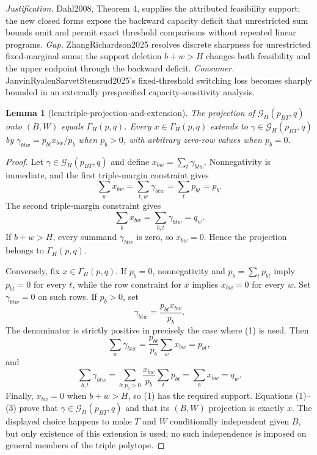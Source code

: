 \documentclass{article}
\newtheorem{lemma}{Lemma}
\begin{document}
\par\smallskip\noindent \textit{Justification.} Dahl2008, Theorem 4, supplies the attributed feasibility support; the new closed forms expose the backward capacity deficit that unrestricted sum bounds omit and permit exact threshold comparisons without repeated linear programs. \textit{Gap.} ZhangRichardson2025 resolves discrete sharpness for unrestricted fixed-marginal sums; the support deletion \(b+w>H\) changes both feasibility and the upper endpoint through the backward deficit. \textit{Consumer.} JanvinRyalenSarvetStensrud2025's fixed-threshold switching loss becomes sharply bounded in an externally prespecified capacity-sensitivity analysis.

\begin{lemma}[lem:triple-projection-and-extension]\label{lem:triple-projection-and-extension}
The projection of \(\mathcal G_H(p_{BT},q)\) onto \((B,W)\) equals \(\Gamma_H(p,q)\). Every \(x\in\Gamma_H(p,q)\) extends to \(\gamma\in\mathcal G_H(p_{BT},q)\) by \(\gamma_{btw}=p_{bt}x_{bw}/p_b\) when \(p_b>0\), with arbitrary zero-row values when \(p_b=0\).
\end{lemma}
\begin{proof}
Let \(\gamma\in\mathcal G_H(p_{BT},q)\) and define \(x_{bw}=\sum_t\gamma_{btw}\).  Nonnegativity is immediate, and the first triple-margin constraint gives
\[
 \sum_wx_{bw}=\sum_{t,w}\gamma_{btw}=\sum_tp_{bt}=p_b.
\]
The second triple-margin constraint gives
\[
 \sum_bx_{bw}=\sum_{b,t}\gamma_{btw}=q_w.
\]
If \(b+w>H\), every summand \(\gamma_{btw}\) is zero, so \(x_{bw}=0\).  Hence the projection belongs to \(\Gamma_H(p,q)\).

Conversely, fix \(x\in\Gamma_H(p,q)\).  If \(p_b=0\), nonnegativity and \(p_b=\sum_tp_{bt}\) imply \(p_{bt}=0\) for every \(t\), while the row constraint for \(x\) implies \(x_{bw}=0\) for every \(w\).  Set \(\gamma_{btw}=0\) on such rows.  If \(p_b>0\), set
\[
 \gamma_{btw}=\frac{p_{bt}x_{bw}}{p_b}.                    \tag{1}
\]
The denominator is strictly positive in precisely the case where (1) is used.  Then
\[
 \sum_w\gamma_{btw}
 =\frac{p_{bt}}{p_b}\sum_wx_{bw}=p_{bt},                  \tag{2}
\]
and
\[
 \sum_{b,t}\gamma_{btw}
 =\sum_{b:p_b>0}\frac{x_{bw}}{p_b}\sum_tp_{bt}
 =\sum_bx_{bw}=q_w.                                       \tag{3}
\]
Finally, \(x_{bw}=0\) when \(b+w>H\), so (1) has the required support.  Equations (1)--(3) prove that \(\gamma\in\mathcal G_H(p_{BT},q)\) and that its \((B,W)\) projection is exactly \(x\).  The displayed choice happens to make \(T\) and \(W\) conditionally independent given \(B\), but only existence of this extension is used; no such independence is imposed on general members of the triple polytope.
\end{proof}
\end{document}
